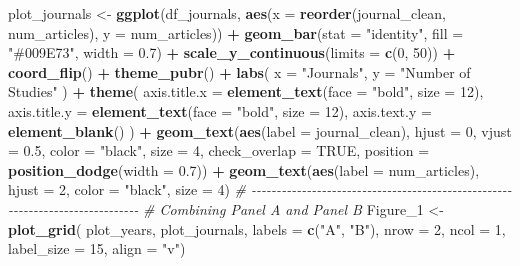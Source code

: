 \documentclass[
]{article}
\newenvironment{Shaded}{\begin{snugshade}}{\end{snugshade}}
\newcommand{\AttributeTok}[1]{\textcolor[rgb]{0.13,0.29,0.53}{#1}}
\newcommand{\CommentTok}[1]{\textcolor[rgb]{0.56,0.35,0.01}{\textit{#1}}}
\newcommand{\ConstantTok}[1]{\textcolor[rgb]{0.56,0.35,0.01}{#1}}
\newcommand{\DecValTok}[1]{\textcolor[rgb]{0.00,0.00,0.81}{#1}}
\newcommand{\FloatTok}[1]{\textcolor[rgb]{0.00,0.00,0.81}{#1}}
\newcommand{\FunctionTok}[1]{\textcolor[rgb]{0.13,0.29,0.53}{\textbf{#1}}}
\newcommand{\NormalTok}[1]{#1}
\newcommand{\OtherTok}[1]{\textcolor[rgb]{0.56,0.35,0.01}{#1}}
\newcommand{\SpecialCharTok}[1]{\textcolor[rgb]{0.81,0.36,0.00}{\textbf{#1}}}
\newcommand{\StringTok}[1]{\textcolor[rgb]{0.31,0.60,0.02}{#1}}
\begin{document}
\begin{Shaded}
\begin{Highlighting}[]
\NormalTok{plot\_journals }\OtherTok{\textless{}{-}} \FunctionTok{ggplot}\NormalTok{(df\_journals, }\FunctionTok{aes}\NormalTok{(}\AttributeTok{x =} \FunctionTok{reorder}\NormalTok{(journal\_clean, num\_articles), }\AttributeTok{y =}\NormalTok{ num\_articles)) }\SpecialCharTok{+}
  \FunctionTok{geom\_bar}\NormalTok{(}\AttributeTok{stat =} \StringTok{"identity"}\NormalTok{, }\AttributeTok{fill =} \StringTok{"\#009E73"}\NormalTok{, }\AttributeTok{width =} \FloatTok{0.7}\NormalTok{) }\SpecialCharTok{+}
  \FunctionTok{scale\_y\_continuous}\NormalTok{(}\AttributeTok{limits =} \FunctionTok{c}\NormalTok{(}\DecValTok{0}\NormalTok{, }\DecValTok{50}\NormalTok{)) }\SpecialCharTok{+}
  \FunctionTok{coord\_flip}\NormalTok{() }\SpecialCharTok{+}
  \FunctionTok{theme\_pubr}\NormalTok{() }\SpecialCharTok{+}
  \FunctionTok{labs}\NormalTok{(}
    \AttributeTok{x =} \StringTok{"Journals"}\NormalTok{,}
    \AttributeTok{y =} \StringTok{"Number of Studies"}
\NormalTok{  ) }\SpecialCharTok{+}
  \FunctionTok{theme}\NormalTok{(}
    \AttributeTok{axis.title.x =} \FunctionTok{element\_text}\NormalTok{(}\AttributeTok{face =} \StringTok{"bold"}\NormalTok{, }\AttributeTok{size =} \DecValTok{12}\NormalTok{),}
    \AttributeTok{axis.title.y =} \FunctionTok{element\_text}\NormalTok{(}\AttributeTok{face =} \StringTok{"bold"}\NormalTok{, }\AttributeTok{size =} \DecValTok{12}\NormalTok{),}
    \AttributeTok{axis.text.y =} \FunctionTok{element\_blank}\NormalTok{()}
\NormalTok{  ) }\SpecialCharTok{+}
  \FunctionTok{geom\_text}\NormalTok{(}\FunctionTok{aes}\NormalTok{(}\AttributeTok{label =}\NormalTok{ journal\_clean), }\AttributeTok{hjust =} \DecValTok{0}\NormalTok{, }\AttributeTok{vjust =} \FloatTok{0.5}\NormalTok{, }
            \AttributeTok{color =} \StringTok{"black"}\NormalTok{, }\AttributeTok{size =} \DecValTok{4}\NormalTok{, }\AttributeTok{check\_overlap =} \ConstantTok{TRUE}\NormalTok{, }
            \AttributeTok{position =} \FunctionTok{position\_dodge}\NormalTok{(}\AttributeTok{width =} \FloatTok{0.7}\NormalTok{)) }\SpecialCharTok{+}
  \FunctionTok{geom\_text}\NormalTok{(}\FunctionTok{aes}\NormalTok{(}\AttributeTok{label =}\NormalTok{ num\_articles), }
            \AttributeTok{hjust =} \DecValTok{2}\NormalTok{, }\AttributeTok{color =} \StringTok{"black"}\NormalTok{, }\AttributeTok{size =} \DecValTok{4}\NormalTok{)}
\CommentTok{\# {-}{-}{-}{-}{-}{-}{-}{-}{-}{-}{-}{-}{-}{-}{-}{-}{-}{-}{-}{-}{-}{-}{-}{-}{-}{-}{-}{-}{-}{-}{-}{-}{-}{-}{-}{-}{-}{-}{-}{-}{-}{-}{-}{-}{-}{-}{-}{-}{-}{-}{-}{-}{-}{-}{-}{-}{-}{-}{-}{-}{-}{-}{-}{-}{-}{-}{-}{-}{-}{-}{-}{-}{-}{-}{-}{-}{-}{-}}
\CommentTok{\# Combining Panel A and Panel B}
\NormalTok{Figure\_1 }\OtherTok{\textless{}{-}} \FunctionTok{plot\_grid}\NormalTok{(}
\NormalTok{  plot\_years, }
\NormalTok{  plot\_journals,}
  \AttributeTok{labels =} \FunctionTok{c}\NormalTok{(}\StringTok{"A"}\NormalTok{, }\StringTok{"B"}\NormalTok{),}
  \AttributeTok{nrow =} \DecValTok{2}\NormalTok{,}
  \AttributeTok{ncol =} \DecValTok{1}\NormalTok{,}
  \AttributeTok{label\_size =} \DecValTok{15}\NormalTok{,}
  \AttributeTok{align =} \StringTok{"v"}\NormalTok{)}


\end{Highlighting}
\end{Shaded}
\end{document}
